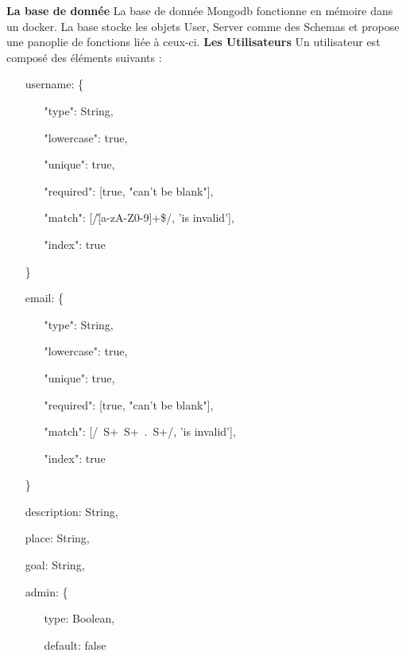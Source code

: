 \documentclass{article}
\begin{document}
\textbf{La base de donnée}
\newline
\newline
La base de donnée Mongodb fonctionne en mémoire dans un docker. La base stocke les objets User, Server comme des Schemas et propose une panoplie de fonctions liée à ceux-ci.
\newline
\newline
\textbf{Les Utilisateurs}
\newline
\newline
Un utilisateur est composé des éléments suivants :
\begin{itemize}
	\item[username: \{]
	\begin{itemize}
		\item[]
		\item[]"type": String,
		\item[]"lowercase": true,
		\item[]"unique": true,
		\item[]"required": [true, "can't be blank"],
		\item[]"match": [/\^ [a-zA-Z0-9]+\$/, 'is invalid'],
		\item[]"index": true
	\end{itemize}
	\item[\}]
	\item[email: \{]
	\begin{itemize}
		\item[]
		\item[]"type": String,
		\item[]"lowercase": true,
		\item[]"unique": true,
		\item[]"required": [true, "can't be blank"],
		\item[]"match": [/\ S+\@\ S+\ .\ S+/, 'is invalid'],
		\item[]"index": true
	\end{itemize}
	\item[\}]
	\item[]description: String,
	\item[]place: String,
	\item[]goal: String,
	\item[admin: \{]
	\begin{itemize}
		\item[]
		\item[]type: Boolean,
		\item[]default: false 
	\end{itemize}

\end{itemize}
\end{document}
